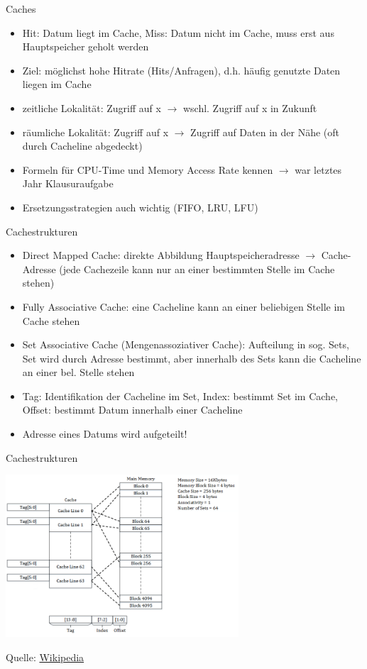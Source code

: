 \documentclass[
  german,            %
  aspectratio=169,    %
]{tumbeamer}
\begin{document}
\begin{frame}[c, fragile]{Caches}{}
  \begin{itemize}
    \item Hit: Datum liegt im Cache, Miss: Datum nicht im Cache, muss erst aus Hauptspeicher geholt werden
    \item Ziel: möglichst hohe Hitrate (Hits/Anfragen), d.h. häufig genutzte Daten liegen im Cache
    \item zeitliche Lokalität: Zugriff auf x $\rightarrow$ wschl. Zugriff auf x in Zukunft
    \item räumliche Lokalität: Zugriff auf x $\rightarrow$ Zugriff auf Daten in der Nähe (oft durch Cacheline abgedeckt)
    \item Formeln für CPU-Time und Memory Access Rate kennen $\rightarrow$ war letztes Jahr Klausuraufgabe
    \item Ersetzungsstrategien auch wichtig (FIFO, LRU, LFU)
  \end{itemize}
\end{frame}

\begin{frame}[c, fragile]{Cachestrukturen}
  \begin{itemize}
    \item Direct Mapped Cache: direkte Abbildung Hauptspeicheradresse $\rightarrow$ Cache-Adresse (jede Cachezeile kann nur an einer bestimmten Stelle im Cache stehen)
    \item Fully Associative Cache: eine Cacheline kann an einer beliebigen Stelle im Cache stehen
    \item Set Associative Cache (Mengenassoziativer Cache): Aufteilung in sog. Sets, Set wird durch Adresse bestimmt, aber innerhalb des Sets kann die Cacheline an einer bel. Stelle stehen
    \item Tag: Identifikation der Cacheline im Set, Index: bestimmt Set im Cache, Offset: bestimmt Datum innerhalb einer Cacheline
    \item Adresse eines Datums wird aufgeteilt!
  \end{itemize}
\end{frame}


\begin{frame}[c, fragile]{Cachestrukturen}
  \begin{center}
    \includegraphics[width=0.65\textwidth]{w10_cache.png}
  \end{center}
  \begin{center}
    \tiny Quelle: \href{https://en.wikipedia.org/wiki/Cache_placement_policies}{Wikipedia}
  \end{center}
\end{frame}
\end{document}
